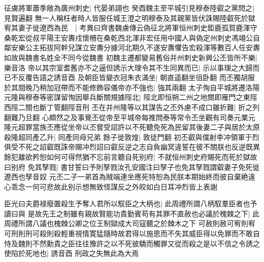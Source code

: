 征虜將軍蕭季敞為廣州刺史|{
	代晏弟詡也}
癸酉魏主至平城引見穆泰陸叡之黨問之|{
	見賢遍翻}
無一人稱枉者時人皆服任城王澄之明穆泰及其親黨皆伏誅賜陸叡死於獄宥其妻子徙遼西為民　|{
	考異曰齊書魏虜傳云偽征北將軍恒州刺史鉅鹿孤賀鹿渾守桑乾宏從叔平陽王安夀戍懷柵在桑乾西北渾非宏任用中國人與偽定州刺史馮翊公自鄰安樂公主拓拔阿幹兒謀立安夀分據河北期久不遂安夀懼告宏殺渾等數百人任安夀如故與魏書名姓全不同今從魏書}
初魏主遷都變易舊俗并州刺史新興公丕皆所不樂|{
	樂音洛}
帝以其宗室耆舊亦不之逼但誘示大理令其不生同異而已|{
	示以事理之大歸而已不反覆告語之誘音酉}
及朝臣皆變衣冠朱衣滿坐|{
	朝直遥翻坐徂卧翻}
而丕獨胡服於其間晚乃稍加冠帶而不能修飾容儀帝亦不強也|{
	強其兩翻}
太子恂自平城將遷洛陽元隆與穆泰等密謀留恂因舉兵斷關規據陘北|{
	陘北即恒朔二州之地關即雁門之東陘西陘二關也斷丁管翻陘音刑}
丕在并州隆等以其謀告之丕外慮不成口雖折難|{
	折之列翻難乃旦翻}
心頗然之及事覺丕從帝至平城帝每推問泰等常令丕坐觀有司奏元業元隆元超罪當族丕應從坐帝以丕嘗受詔許以不死聽免死為民留其後妻二子與居於太原殺隆超同產乙升|{
	同產同母兄弟}
餘子徙敦煌|{
	敦徒門翻}
初丕叡與僕射李冲領軍于烈俱受不死之詔叡既誅帝賜冲烈詔曰叡反逆之志自負幽冥違誓在彼不關朕也反逆既異餘犯雖欲矜恕如何可得然猶不忘前言聽自死别府|{
	不就恒州刺史府賜死而死於獄故曰别府}
免其孥戮|{
	書甘誓曰予則孥戮汝孔安國注曰孥子也免其孥戮謂叡妻子免死徙遼西也孥音奴}
元丕二子一弟首為賊端連坐應死特恕為民朕本期始終而彼自棄絶違心乖念一何可悲故此别示想無致怪謀反之外皎如白日耳冲烈皆上表謝

臣光曰夫爵禄廢置殺生予奪人君所以馭臣之大柄也|{
	此周禮所謂八柄馭羣臣者也予讀曰與}
是故先王之制雖有親故賢能功貴勤賓苟有其罪不直赦也必議於槐棘之下|{
	此周禮所謂八議也槐棘公卿之位王制獄成大司寇聽之於棘木之下}
可赦則赦可宥則宥可刑則刑可殺則殺輕重視情寛猛隨時故君得以施恩而不失其威臣得以免罪而不敢自恃及魏則不然勳貴之臣往往豫許之以不死彼驕而觸罪又從而殺之是以不信之令誘之使陷於死地也|{
	誘音酉}
刑政之失無此為大焉


